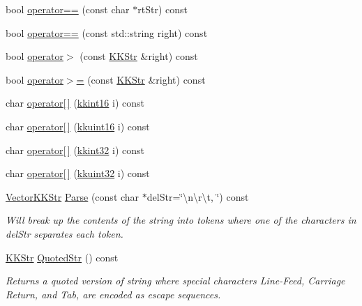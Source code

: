 \begin{DoxyCompactItemize}
\item 
bool \hyperlink{class_k_k_b_1_1_k_k_str_a996ccbee24c00e5811a9bf4182ed70cb}{operator==} (const char $\ast$rt\+Str) const 
\item 
bool \hyperlink{class_k_k_b_1_1_k_k_str_a09b9bc732a4adba3bcdbd88902c62e4a}{operator==} (const std\+::string right) const 
\item 
bool \hyperlink{class_k_k_b_1_1_k_k_str_afd2eb0b07e30496172ae1b4517be6c1e}{operator$>$} (const \hyperlink{class_k_k_b_1_1_k_k_str}{K\+K\+Str} \&right) const 
\item 
bool \hyperlink{class_k_k_b_1_1_k_k_str_a82a51d9c5263aa861838c7e1cbcd268c}{operator$>$=} (const \hyperlink{class_k_k_b_1_1_k_k_str}{K\+K\+Str} \&right) const 
\item 
char \hyperlink{class_k_k_b_1_1_k_k_str_abe6e9f163abd7798a2c0cd159aaf1f28}{operator\mbox{[}$\,$\mbox{]}} (\hyperlink{namespace_k_k_b_a93809780ee294124dda4c23069f41248}{kkint16} i) const 
\item 
char \hyperlink{class_k_k_b_1_1_k_k_str_ac10e7682ca9463c8aca990ac8ea03c6e}{operator\mbox{[}$\,$\mbox{]}} (\hyperlink{namespace_k_k_b_aa8c7d4d30381c8a0b6fce68974a9c8a9}{kkuint16} i) const 
\item 
char \hyperlink{class_k_k_b_1_1_k_k_str_aece78e29cd06977c7ad35b66aca4e65b}{operator\mbox{[}$\,$\mbox{]}} (\hyperlink{namespace_k_k_b_a8fa4952cc84fda1de4bec1fbdd8d5b1b}{kkint32} i) const 
\item 
char \hyperlink{class_k_k_b_1_1_k_k_str_a229ac61f513698a0b88aedee2422f704}{operator\mbox{[}$\,$\mbox{]}} (\hyperlink{namespace_k_k_b_af8d832f05c54994a1cce25bd5743e19a}{kkuint32} i) const 
\item 
\hyperlink{class_k_k_b_1_1_vector_k_k_str}{Vector\+K\+K\+Str} \hyperlink{class_k_k_b_1_1_k_k_str_aac3f264e22bf373f67828270565e94a4}{Parse} (const char $\ast$del\+Str=\char`\"{}\textbackslash{}n\textbackslash{}r\textbackslash{}t, \char`\"{}) const 
\begin{DoxyCompactList}\small\item\em Will break up the contents of the string into tokens where one of the characters in \textquotesingle{}del\+Str\textquotesingle{} separates each token. \end{DoxyCompactList}\item 
\hyperlink{class_k_k_b_1_1_k_k_str}{K\+K\+Str} \hyperlink{class_k_k_b_1_1_k_k_str_a193b549c8d4b41a9692f890dae1993f4}{Quoted\+Str} () const 
\begin{DoxyCompactList}\small\item\em Returns a quoted version of string where special characters Line-\/\+Feed, Carriage Return, and Tab, are encoded as escape sequences. \end{DoxyCompactList}\item 

\end{DoxyCompactItemize}
